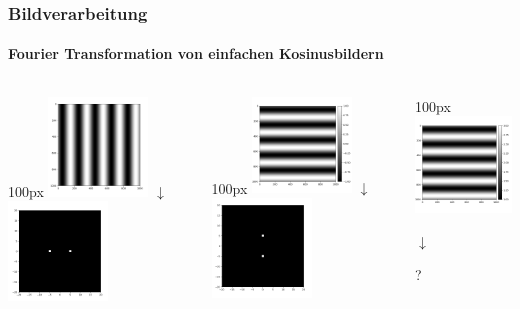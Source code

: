 \begin{frame}
    \frametitle{Bildverarbeitung}
    \framesubtitle{Fourier Transformation von einfachen Kosinusbildern}
    \begin{columns}[t]
        \begin{column}{100px}
            \centering
            \includegraphics[width=100px]{images/04-applications-image-cos.png}
            $\downarrow$
            \includegraphics[width=100px]{images/04-applications-image-cos-ft.png}
        \end{column}
        \begin{column}{100px}
            \centering
            \includegraphics[width=100px]{images/04-applications-image-cos-rot.png}
            $\downarrow$
            \includegraphics[width=100px]{images/04-applications-image-cos-rot-ft.png}
        \end{column}
        \begin{column}{100px}
            \centering
            \includegraphics[width=100px]{images/04-applications-image-cos-rot-dc.png}
        \begin{tcolorbox}[halign=center, colback=white, boxrule=0pt, colframe=white, enlarge top by=-0.45cm]
            $\downarrow $ 

            \vspace{30px}
            \LARGE{?}
            \end{tcolorbox}
        \end{column}
    \end{columns}
\end{frame}

